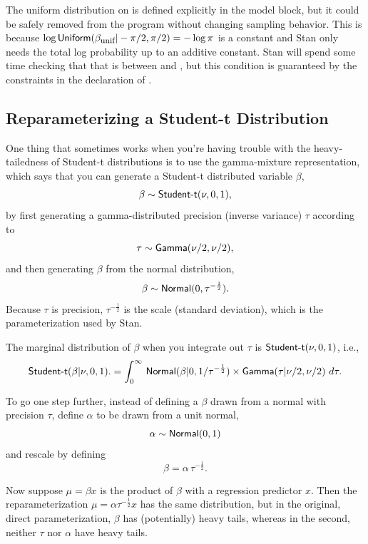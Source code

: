 The uniform distribution on  is defined explicitly in
the model block, but it could be safely removed from the program
without changing sampling behavior.  This is because $\log
\distro{Uniform}(\beta_{\mbox{\footnotesize unif}}|-\pi/2,\pi/2) =
-\log \pi$ is a constant and Stan only
needs the total log probability up to an additive constant.  Stan will spend
some time checking that that  is between
 and , but this condition is guaranteed by
the constraints in the declaration of .  

\subsection{Reparameterizing a Student-t Distribution}

One thing that sometimes works when you're having trouble with the
heavy-tailedness of Student-t distributions is to use the
gamma-mixture representation, which says that you can generate a
Student-t distributed variable $\beta$,
\[
\beta \sim \mbox{\sf Student-t}(\nu, 0, 1),
\]
by first generating a gamma-distributed precision (inverse variance)
$\tau$ according to
\[
\tau \sim \mbox{\sf Gamma}(\nu/2, \nu/2),
\]
and then generating $\beta$ from the normal distribution,
\[
\beta \sim \mbox{\sf Normal}(0,\tau^{-\frac{1}{2}}).
\]
%
Because $\tau$ is precision, $\tau^{-\frac{1}{2}}$ is the scale
(standard deviation), which is the parameterization used by Stan.

The marginal distribution of $\beta$ when you integrate out $\tau$ is
$\mbox{\sf Student-t}(\nu, 0, 1)$, i.e.,
\[
\mbox{\sf Student-t}(\beta | \nu,0,1).
= 
\int_0^{\infty} 
\,
\mbox{\sf Normal}(\beta | 0, 1 / \tau^{-\frac{1}{2}})
\times
\mbox{\sf Gamma}(\tau | \nu/2, \nu/2)
\
d\tau.
\]
%

To go one step further, instead of defining a $\beta$ drawn from a
normal with precision $\tau$, define $\alpha$ to be drawn from a unit
normal,
%
\[
\alpha \sim \mbox{\sf Normal}(0,1)
\]
%
and rescale by defining
%
\[
\beta = \alpha \, \tau^{-\frac{1}{2}}.
\]
%

Now suppose $\mu = \beta x$ is the product of $\beta$ with a
regression predictor $x$.  Then the reparameterization $\mu = \alpha
\tau^{-\frac{1}{2}} x$ has the same distribution, but in the original, direct
parameterization, $\beta$ has (potentially) heavy tails, whereas in
the second, neither $\tau$ nor $\alpha$ have heavy tails.

